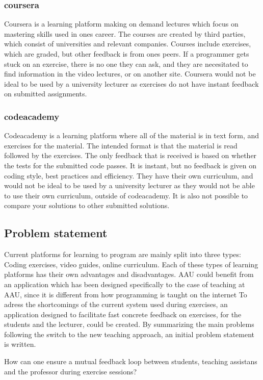 \subsubsection*{coursera}
Coursera is a learning platform making on demand lectures which focus on mastering skills used in ones career. 
The courses are created by third parties, which consist of universities and relevant companies. 
Courses include exercises, which are graded, but other feedback is from ones peers. If a programmer gets stuck on an exercise, there is no one they can ask, and they are necesitated to find information in the video lectures, or on another site.
Coursera would not be ideal to be used by a university lecturer as exercises do not have instant feedback on submitted assignments.

\subsubsection*{codeacademy}
Codeacademy is a learning platform where all of the material is in text form, and exercises for the material. The intended format is that the material is read followed by the exercises. The only feedback that is received is based on whether the tests for the submitted code passes. It is instant, but no feedback is given on coding style, best practices and efficiency. 
They have their own curriculum, and would not be ideal to be used by a university lecturer as they would not be able to use their own curriculum, outside of codeacademy. It is also not possible to compare your solutions to other submitted solutions.

\subsection{Problem statement}
    
Current platforms for learning to program are mainly split into three types: Coding exercises, video guides, online curriculum. 
Each of these types of learning platforms has their own advantages and disadvantages. AAU could benefit from an application which has been designed specifically to the case of teaching at AAU, since it is different from how programming is taught on the internet
To adress the shortcomings of the current system used during exercises, an application designed to facilitate fast concrete feedback on exercises, for the students and the lecturer, could be created.
By summarizing the main problems following the switch to the new teaching approach, an initial problem statement is written.
\begin{displayquote}
How can one ensure a mutual feedback loop between students, teaching assistans and the professor during exercise sessions?
\end{displayquote} 

